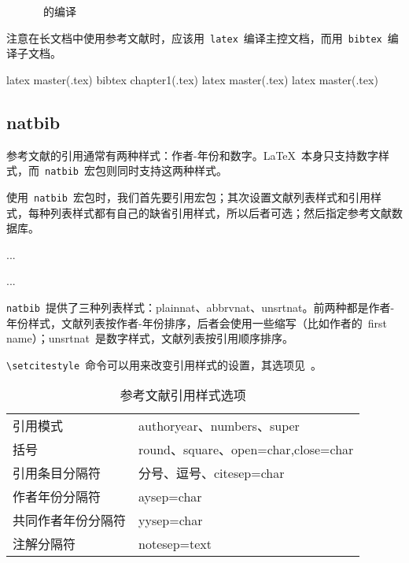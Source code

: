 \begin{figure}[htbp]
\centering
{}
\caption{\BibTeX~的编译}
\label{fig:bibtex}
\end{figure}

注意在长文档中使用参考文献时，应该用~\verb|latex|~编译主控文档，而用~\verb|bibtex|~编译子文档。

\begin{code}
latex master(.tex)
bibtex chapter1(.tex)
latex master(.tex)
latex master(.tex)
\end{code}

\subsection{natbib}
参考文献的引用通常有两种样式：作者-年份和数字。\LaTeX~本身只支持数字样式，而~\verb|natbib|~宏包\citep{Daly_2007}则同时支持这两种样式。

使用~\verb|natbib|~宏包时，我们首先要引用宏包；其次设置文献列表样式和引用样式，每种列表样式都有自己的缺省引用样式，所以后者可选；然后指定参考文献数据库。
\begin{code}
\usepackage{natbib}
...



...

\end{code}

\verb|natbib|~提供了三种列表样式：plainnat、abbrvnat、unsrtnat。前两种都是作者-年份样式，文献列表按作者-年份排序，后者会使用一些缩写（比如作者的~first name）；unsrtnat~是数字样式，文献列表按引用顺序排序。

\verb|\setcitestyle|~命令可以用来改变引用样式的设置，其选项见~。

\begin{table}[htbp]
\caption{参考文献引用样式选项}
\label{tab:citestyle}
\centering
\begin{tabular}{ll}
    \toprule
    引用模式            & authoryear、numbers、super \\
    括号                & round、square、open={char},close={char} \\
    引用条目分隔符      & 分号、逗号、citesep={char} \\
    作者年份分隔符      & aysep={char} \\
    共同作者年份分隔符  & yysep={char} \\
    注解分隔符          & notesep={text} \\
    \bottomrule
\end{tabular}
\end{table}


